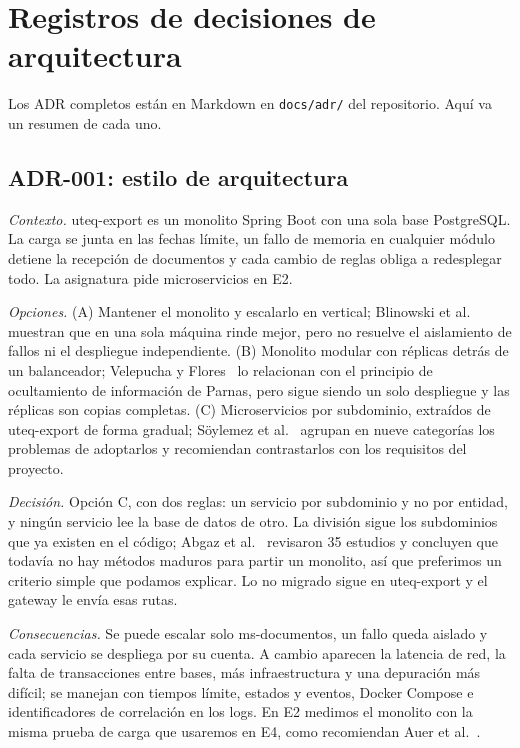 \section{Registros de decisiones de arquitectura}\label{sec:adr}

Los ADR completos están en Markdown en \texttt{docs/adr/} del repositorio. Aquí va un resumen de cada uno.

\subsection{ADR-001: estilo de arquitectura}

\textit{Contexto.} uteq-export es un monolito Spring Boot con una sola base PostgreSQL. La carga se junta en las fechas límite, un fallo de memoria en cualquier módulo detiene la recepción de documentos y cada cambio de reglas obliga a redesplegar todo. La asignatura pide microservicios en E2.

\textit{Opciones.} (A) Mantener el monolito y escalarlo en vertical; Blinowski et al.~\cite{blinowski2022monolithic} muestran que en una sola máquina rinde mejor, pero no resuelve el aislamiento de fallos ni el despliegue independiente. (B) Monolito modular con réplicas detrás de un balanceador; Velepucha y Flores~\cite{velepucha2023survey} lo relacionan con el principio de ocultamiento de información de Parnas, pero sigue siendo un solo despliegue y las réplicas son copias completas. (C) Microservicios por subdominio, extraídos de uteq-export de forma gradual; Söylemez et al.~\cite{soylemez2022challenges} agrupan en nueve categorías los problemas de adoptarlos y recomiendan contrastarlos con los requisitos del proyecto.

\textit{Decisión.} Opción C, con dos reglas: un servicio por subdominio y no por entidad, y ningún servicio lee la base de datos de otro. La división sigue los subdominios que ya existen en el código; Abgaz et al.~\cite{abgaz2023decomposition} revisaron 35 estudios y concluyen que todavía no hay métodos maduros para partir un monolito, así que preferimos un criterio simple que podamos explicar. Lo no migrado sigue en uteq-export y el gateway le envía esas rutas.

\textit{Consecuencias.} Se puede escalar solo ms-documentos, un fallo queda aislado y cada servicio se despliega por su cuenta. A cambio aparecen la latencia de red, la falta de transacciones entre bases, más infraestructura y una depuración más difícil; se manejan con tiempos límite, estados y eventos, Docker Compose e identificadores de correlación en los logs. En E2 medimos el monolito con la misma prueba de carga que usaremos en E4, como recomiendan Auer et al.~\cite{auer2021monolithic}.


